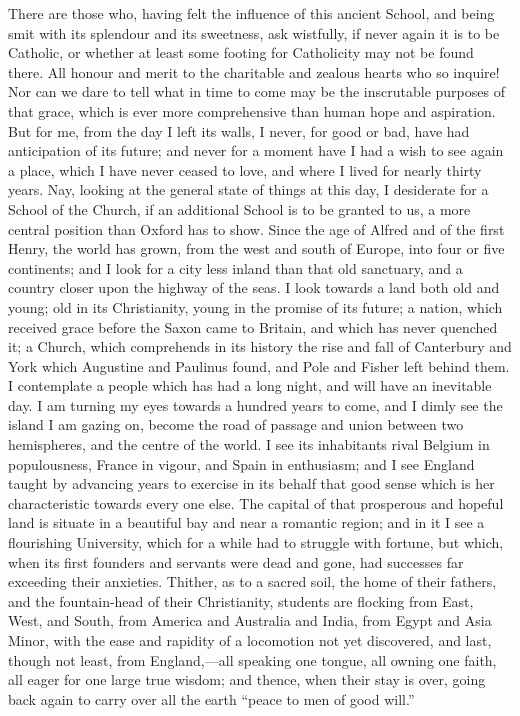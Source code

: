 There are those who, having felt the influence of this ancient
School, and being smit with its splendour and its sweetness, ask
wistfully, if never again it is to be Catholic, or whether at least
some footing for Catholicity may not be found there. All honour and
merit to the charitable and zealous hearts who so inquire! Nor can we
dare to tell what in time to come may be the inscrutable purposes of
that grace, which is ever more comprehensive than human hope and
aspiration. But for me, from the day I left its walls, I never, for
good or bad, have had anticipation of its future; and never for a
moment have I had a wish to see again a place, which I have never
ceased to love, and where I lived for nearly thirty years. Nay,
looking at the general state of things at this day, I desiderate for a
School of the Church, if an additional School is to be granted to us,
a more central position than Oxford has to show. Since the age of
Alfred and of the first Henry, the world has grown, from the west and
south of Europe, into four or five continents; and I look for a city
less inland than that old sanctuary, and a country closer upon the
highway of the seas. I look towards a land both old and young; old in
its Christianity, young in the promise of its future; a nation, which
received grace before the Saxon came to Britain, and which has never
quenched it; a Church, which comprehends in its history the rise and
fall of Canterbury and York which Augustine and Paulinus found, and
Pole and Fisher left behind them. I contemplate a people which
has had a long night, and will have an inevitable day. I am turning my
eyes towards a hundred years to come, and I dimly see the island I am
gazing on, become the road of passage and union between two
hemispheres, and the centre of the world. I see its inhabitants rival
Belgium in populousness, France in vigour, and Spain in enthusiasm;
and I see England taught by advancing years to exercise in its behalf
that good sense which is her characteristic towards every one else.
The capital of that prosperous and hopeful land is situate in a
beautiful bay and near a romantic region; and in it I see a
flourishing University, which for a while had to struggle with
fortune, but which, when its first founders and servants were dead and
gone, had successes far exceeding their anxieties. Thither, as to a
sacred soil, the home of their fathers, and the fountain-head of their
Christianity, students are flocking from East, West, and South, from
America and Australia and India, from Egypt and Asia Minor, with the
ease and rapidity of a locomotion not yet discovered, and last, though
not least, from England,—all speaking one tongue, all owning one
faith, all eager for one large true wisdom; and thence, when their
stay is over, going back again to carry over all the earth ``peace
to men of good will.''

